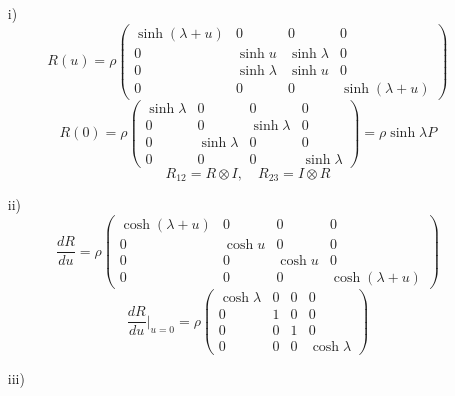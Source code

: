 \documentclass[12pt]{article}
\theoremstyle{definition}
\begin{document}
\begin{enumerate}
\begin{itemize}
        \item[i)]
        \begin{equation}
            R(u)=\rho\begin{pmatrix}
                \sinh(\lambda+u) & 0 & 0 & 0\\
                0 & \sinh u & \sinh\lambda & 0\\
                0 & \sinh\lambda & \sinh u & 0\\
                0 & 0 & 0 & \sinh(\lambda+u)
            \end{pmatrix}
        \end{equation}
        \begin{equation}
            R(0)=\rho\begin{pmatrix}
                \sinh\lambda & 0 & 0 & 0\\
                0 & 0 & \sinh\lambda & 0\\
                0 & \sinh\lambda & 0 & 0\\
                0 & 0 & 0 & \sinh\lambda
            \end{pmatrix}=\rho\sinh\lambda P
        \end{equation}
        \begin{equation}
            R_{12}=R\otimes I,\quad R_{23}=I\otimes R
        \end{equation}
        \item[ii)]
        \begin{equation}
            \frac{dR}{du}=\rho\begin{pmatrix}
                \cosh(\lambda+u) & 0 & 0 & 0\\
                0 & \cosh u & 0 & 0\\
                0 & 0 & \cosh u & 0\\
                0 & 0 & 0 & \cosh(\lambda+u)
            \end{pmatrix}
        \end{equation}
        \begin{equation}
            \boxed{\frac{dR}{du}|_{u=0}=\rho\begin{pmatrix}
                \cosh\lambda & 0 & 0 & 0\\
                0 & 1 & 0 & 0\\
                0 & 0 & 1 & 0\\
                0 & 0 & 0 & \cosh\lambda
            \end{pmatrix}}
        \end{equation}
        \item[iii)]

\end{itemize}
\end{enumerate}
\end{document}
